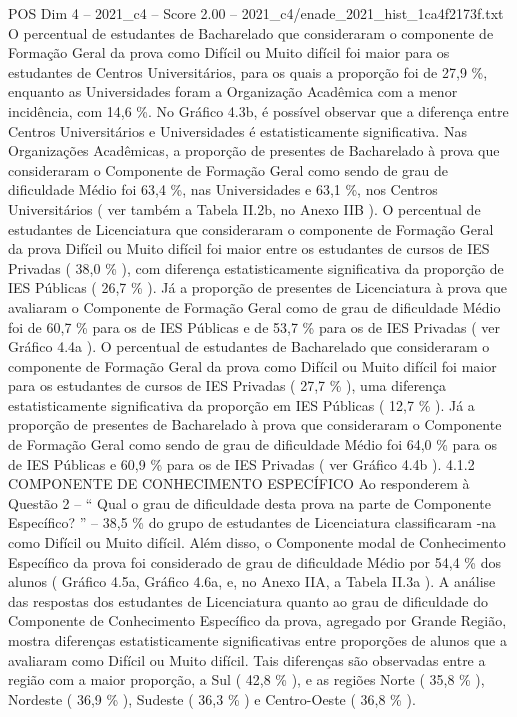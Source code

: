 \begin{textsample}{POS Dim 4 – 2021\_c4 – Score 2.00 – 2021\_c4/enade\_2021\_hist\_1ca4f2173f.txt}
O percentual de estudantes de Bacharelado que consideraram o componente de Formação Geral da prova como Difícil ou Muito difícil foi maior para os estudantes de Centros Universitários, para os quais a proporção foi de 27,9 \%, enquanto as Universidades foram a Organização Acadêmica com a menor incidência, com 14,6 \%.
No Gráfico 4.3b, é possível observar que a diferença entre Centros Universitários e Universidades é estatisticamente significativa.
Nas Organizações Acadêmicas, a proporção de presentes de Bacharelado à prova que consideraram o Componente de Formação Geral como sendo de grau de dificuldade Médio foi 63,4 \%, nas Universidades e 63,1 \%, nos Centros Universitários ( ver também a Tabela II.2b, no Anexo IIB ).
O percentual de estudantes de Licenciatura que consideraram o componente de Formação Geral da prova Difícil ou Muito difícil foi maior entre os estudantes de cursos de IES Privadas ( 38,0 \% ), com diferença estatisticamente significativa da proporção de IES Públicas ( 26,7 \% ).
Já a proporção de presentes de Licenciatura à prova que avaliaram o Componente de Formação Geral como de grau de dificuldade Médio foi de 60,7 \% para os de IES Públicas e de 53,7 \% para os de IES Privadas ( ver Gráfico 4.4a ).
O percentual de estudantes de Bacharelado que consideraram o componente de Formação Geral da prova como Difícil ou Muito difícil foi maior para os estudantes de cursos de IES Privadas ( 27,7 \% ), uma diferença estatisticamente significativa da proporção em IES Públicas ( 12,7 \% ).
Já a proporção de presentes de Bacharelado à prova que consideraram o Componente de Formação Geral como sendo de grau de dificuldade Médio foi 64,0 \% para os de IES Públicas e 60,9 \% para os de IES Privadas ( ver Gráfico 4.4b ). 4.1.2 COMPONENTE DE CONHECIMENTO ESPECÍFICO Ao responderem à Questão 2 – “ Qual o grau de dificuldade desta prova na parte de Componente Específico? ” – 38,5 \% do grupo de estudantes de Licenciatura classificaram -na como Difícil ou Muito difícil.
Além disso, o Componente modal de Conhecimento Específico da prova foi considerado de grau de dificuldade Médio por 54,4 \% dos alunos ( Gráfico 4.5a, Gráfico 4.6a, e, no Anexo IIA, a Tabela II.3a ).
A análise das respostas dos estudantes de Licenciatura quanto ao grau de dificuldade do Componente de Conhecimento Específico da prova, agregado por Grande Região, mostra diferenças estatisticamente significativas entre proporções de alunos que a avaliaram como Difícil ou Muito difícil.
Tais diferenças são observadas entre a região com a maior proporção, a Sul ( 42,8 \% ), e as regiões Norte ( 35,8 \% ), Nordeste ( 36,9 \% ), Sudeste ( 36,3 \% ) e Centro-Oeste ( 36,8 \% ).

\end{textsample}
